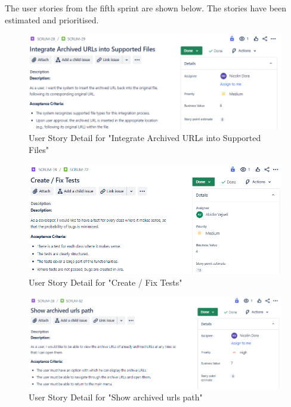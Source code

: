 The user stories from the fifth sprint are shown below. The stories have been estimated and prioritised.
\begin{figure}[h!]
    \centering
    \includegraphics[width=1\textwidth]{pictures/Scrum/Sprint 5/UserStory_10}
    \caption{User Story Detail for "Integrate Archived URLs into Supported Files"}
    \label{fig:sprint_5_userstory_1}
\end{figure}
\begin{figure}[h!]
    \centering
    \includegraphics[width=1\textwidth]{pictures/Scrum/Sprint 5/UserStory_23}
    \caption{User Story Detail for "Create / Fix Tests"}
    \label{fig:sprint_5_userstory_2}
\end{figure}
\begin{figure}[h!]
    \centering
    \includegraphics[width=1\textwidth]{pictures/Scrum/Sprint 5/UserStory_25}
    \caption{User Story Detail for "Show archived urls path"}
    \label{fig:sprint_5_userstory_3}
\end{figure}
\clearpage

